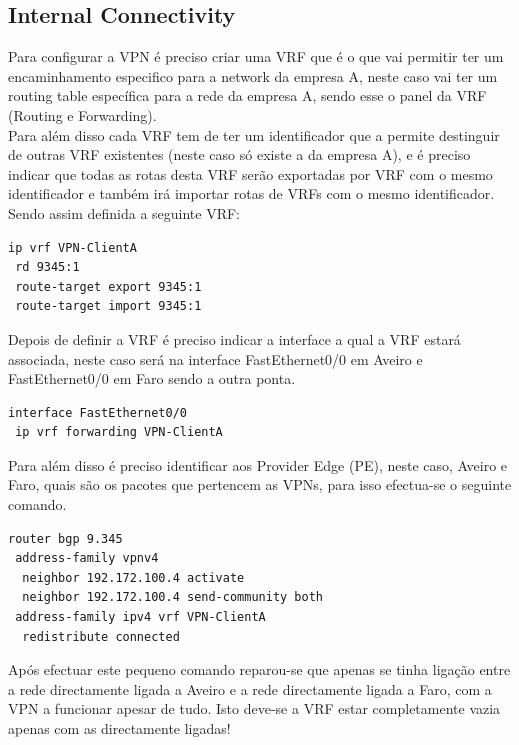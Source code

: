 \documentclass[11pt,a4paper]{report}
\begin{document}
\subsection{Internal Connectivity}
Para configurar a VPN é preciso criar uma VRF que é o que vai permitir ter um encaminhamento especifico para a network da empresa A, neste caso vai ter um routing table específica para a rede da empresa A, sendo esse o panel da VRF (Routing e Forwarding).\\

Para além disso cada VRF tem de ter um identificador que a permite destinguir de outras VRF existentes (neste caso só existe a da empresa A), e é preciso indicar que todas as rotas desta VRF serão exportadas por VRF com o mesmo identificador e também irá importar rotas de VRFs com o mesmo identificador. Sendo assim definida a seguinte VRF:\\

\begin{lstlisting}[caption=VPN - Criar uma VRF e associar um router distinguisher]
ip vrf VPN-ClientA
 rd 9345:1
 route-target export 9345:1
 route-target import 9345:1
\end{lstlisting}

Depois de definir a VRF é preciso indicar a interface a qual a VRF estará associada, neste caso será na interface FastEthernet0/0 em Aveiro e FastEthernet0/0 em Faro sendo a outra ponta.

\begin{lstlisting}[caption=VPN - Associar a VRF a uma interface]
interface FastEthernet0/0
 ip vrf forwarding VPN-ClientA
\end{lstlisting}


Para além disso é preciso identificar aos Provider Edge (PE), neste caso, Aveiro e Faro, quais são os pacotes que pertencem as VPNs, para isso efectua-se o seguinte comando.\\

\begin{lstlisting}[caption=VPN - Anunciar os labels das VPNs]
router bgp 9.345
 address-family vpnv4
  neighbor 192.172.100.4 activate
  neighbor 192.172.100.4 send-community both
 address-family ipv4 vrf VPN-ClientA
  redistribute connected
\end{lstlisting}

Após efectuar este pequeno comando reparou-se que apenas se tinha ligação entre a rede directamente ligada a Aveiro e a rede directamente ligada a Faro, com a VPN a funcionar apesar de tudo. Isto deve-se a VRF estar completamente vazia apenas com as directamente ligadas!\\
\end{document}
